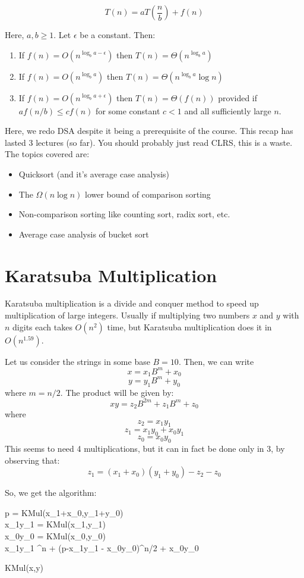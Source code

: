 \documentclass[12pt,letterpaper]{article}
\theoremstyle{definition}
\begin{document}
\[T(n) = aT\left(\frac{n}{b}\right) + f(n)\]

Here, $a, b \geq 1$. Let $\epsilon$ be a constant. Then:

\begin{enumerate}
  \item If $f(n) = O(n^{\log_ba - \epsilon})$ then $T(n) = \Theta(n^{\log_ba})$
  \item If $f(n) = O(n^{\log_ba})$ then $T(n) = \Theta(n^{\log_ba}\log{n})$
  \item If $f(n) = O(n^{\log_ba + \epsilon})$ then $T(n) = \Theta(f(n))$ provided if $af(n/b) \leq cf(n)$ for some constant $c <1$ and all sufficiently large $n$.
\end{enumerate}

Here, we redo DSA despite it being a prerequisite of the course. This recap has lasted 3 lectures (so far). You should probably just read CLRS, this is a waste. The topics covered are:

\begin{itemize}
  \item Quicksort (and it's average case analysis)
  \item The $\Omega(n\log{n})$ lower bound of comparison sorting
  \item Non-comparison sorting like counting sort, radix sort, etc.
  \item Average case analysis of bucket sort
\end{itemize}

\section{Karatsuba Multiplication}

Karatsuba multiplication is a divide and conquer method to speed up multiplication of large integers. Usually if multiplying two numbers $x$ and $y$ with $n$ digits each takes $O(n^2)$ time, but Karatsuba multiplication does it in $O(n^{1.59})$.

Let us consider the strings in some base $B = 10$. Then, we can write
\[x = x_1 B^m + x_0\]
\[y = y_1 B^m + y_0 \]
where $m = n/2$.
The product will be given by:
\[xy = z_2 B^{2m} + z_1 B^m + z_0\]
where
\[z_2 = x_1y_1\]
\[z_1 = x_1y_0 + x_0y_1\]
\[z_0 = x_0y_0\]
This seems to need 4 multiplications, but it can in fact be done only in 3, by observing that:
\[z_1 = (x_1 + x_0)(y_1 + y_0) - z_2 - z_0\]

So, we get the algorithm:

\begin{algorithm}[H]
  \SetAlgoLined
  p = KMul(x_1+x_0,y_1+y_0) \\
  x_1y_1 = KMul(x_1,y_1) \\
  x_0y_0 = KMul(x_0,y_0) \\
  \Return x_1y_1 ^n + (p-x_1y_1 - x_0y_0)^{n/2} + x_0y_0
  \caption{KMul(x,y)}
\end{algorithm}
\end{document}
